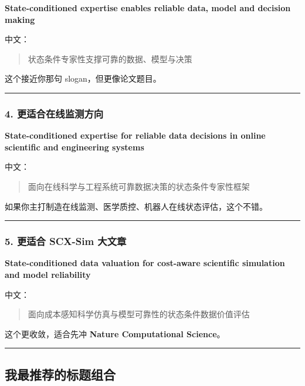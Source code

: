 \documentclass[
  12pt,
]{ctexart}
\begin{document}
\textbf{State-conditioned expertise enables reliable data, model and
decision making}

中文：

\begin{quote}
状态条件专家性支撑可靠的数据、模型与决策
\end{quote}

这个接近你那句 slogan，但更像论文题目。

\begin{center}\rule{0.5\linewidth}{0.5pt}\end{center}

\subsubsection{4.
更适合在线监测方向}\label{ux66f4ux9002ux5408ux5728ux7ebfux76d1ux6d4bux65b9ux5411}

\textbf{State-conditioned expertise for reliable data decisions in
online scientific and engineering systems}

中文：

\begin{quote}
面向在线科学与工程系统可靠数据决策的状态条件专家性框架
\end{quote}

如果你主打制造在线监测、医学质控、机器人在线状态评估，这个不错。

\begin{center}\rule{0.5\linewidth}{0.5pt}\end{center}

\subsubsection{5. 更适合 SCX-Sim
大文章}\label{ux66f4ux9002ux5408-scx-sim-ux5927ux6587ux7ae0}

\textbf{State-conditioned data valuation for cost-aware scientific
simulation and model reliability}

中文：

\begin{quote}
面向成本感知科学仿真与模型可靠性的状态条件数据价值评估
\end{quote}

这个更收敛，适合先冲 \textbf{Nature Computational Science}。

\begin{center}\rule{0.5\linewidth}{0.5pt}\end{center}

\subsection{我最推荐的标题组合}\label{ux6211ux6700ux63a8ux8350ux7684ux6807ux9898ux7ec4ux5408}
\end{document}
